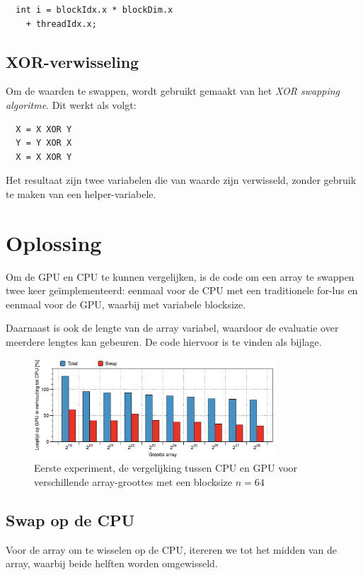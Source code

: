 \documentclass[10pt, twocolumn, a4paper]{article}
\begin{document}
\begin{verbatim}
  int i = blockIdx.x * blockDim.x 
    + threadIdx.x;
\end{verbatim}
\label{c:index}

\subsection{XOR-verwisseling}
Om de waarden te swappen, wordt gebruikt gemaakt van het \emph{XOR swapping algoritme}. Dit werkt als volgt:

\begin{verbatim}
  X = X XOR Y
  Y = Y XOR X
  X = X XOR Y
\end{verbatim}

Het resultaat zijn twee variabelen die van waarde zijn verwisseld, zonder gebruik te maken van een helper-variabele.

\section{Oplossing}
Om de GPU en CPU te kunnen vergelijken, is de code om een array te swappen twee keer ge\"implementeerd: eenmaal voor de CPU met een traditionele for-lus en eenmaal voor de GPU, waarbij met variabele blocksize.

Daarnaast is ook de lengte van de array variabel, waardoor de evaluatie over meerdere lengtes kan gebeuren. De code hiervoor is te vinden als bijlage.

\begin{figure}
  \centering
  \includegraphics[width=0.8\textwidth]{cpu_vs_gpu.eps}
  \caption{Eerste experiment, de vergelijking tussen CPU en GPU voor verschillende array-groottes met een blocksize $n=64$}
  \label{fig:b4_cpu_gpu}
\end{figure}

\subsection{Swap op de CPU}
Voor de array om te wisselen op de CPU, itereren we tot het midden van de array, waarbij beide helften worden omgewisseld.
\end{document}
